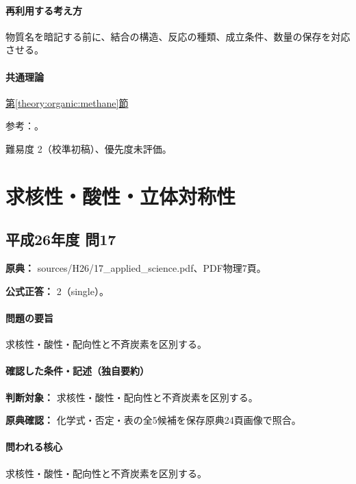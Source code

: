 \paragraph{再利用する考え方} 物質名を暗記する前に、結合の構造、反応の種類、成立条件、数量の保存を対応させる。

\paragraph{共通理論} \hyperref[theory:organic:methane]{第\ref*{theory:organic:methane}節}

\par 参考：\cite{organic_methane,organic_isomers}。

\par 難易度 2（校準初稿）、優先度未評価。

\section{求核性・酸性・立体対称性}

\subsection{平成26年度 問17}
\label{q:h26-reg-applied-17}

\noindent\textbf{原典：} sources/H26/17\_applied\_science.pdf、PDF物理7頁。

\textbf{公式正答：} 2（single）。

\paragraph{問題の要旨} 求核性・酸性・配向性と不斉炭素を区別する。

\paragraph{確認した条件・記述（独自要約）}\mbox{}\par

\noindent\textbf{判断対象：} 求核性・酸性・配向性と不斉炭素を区別する。\par

\noindent\textbf{原典確認：} 化学式・否定・表の全5候補を保存原典24頁画像で照合。\par

\paragraph{問われる核心} 求核性・酸性・配向性と不斉炭素を区別する。

